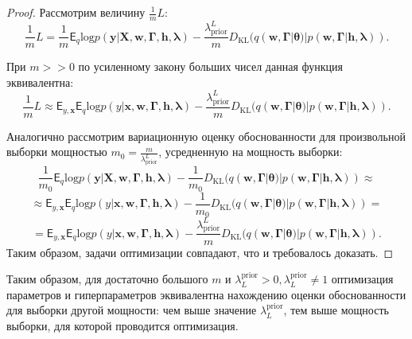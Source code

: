\begin{proof}
Рассмотрим величину  $\frac{1}{m}L$: \\
\[
    \frac{1}{m}L = \frac{1}{m}\mathsf{E}_q \text{log}p(\mathbf{y}|\mathbf{X},  \mathbf{w}, \boldsymbol{\Gamma}, \mathbf{h}, \boldsymbol{\lambda})-\frac{\lambda_\text{prior}^L}{m}D_\text{KL}(q(\mathbf{w}, \boldsymbol{\Gamma}|\boldsymbol{\theta})|p(\mathbf{w},\boldsymbol{\Gamma}|\mathbf{h}, \boldsymbol{\lambda})).
\]

При $m >> 0$ по усиленному закону больших чисел данная функция эквивалентна:
\[
    \frac{1}{m}L \approx  \mathsf{E}_{y, \mathbf{x}} \mathsf{E}_{q} \text{log}p(y|\mathbf{x}, \mathbf{w}, \boldsymbol{\Gamma}, \mathbf{h}, \boldsymbol{\lambda}) -\frac{\lambda_\text{prior}^L}{m}D_\text{KL}(q(\mathbf{w}, \boldsymbol{\Gamma}|\boldsymbol{\theta})|p(\mathbf{w},\boldsymbol{\Gamma}|\mathbf{h}, \boldsymbol{\lambda})).
\]

Аналогично рассмотрим вариационную оценку обоснованности для произвольной выборки мощностью $m_0 = \frac{m}{\lambda_\text{prior}^L}$, усредненную на мощность выборки:
\[
    \frac{1}{m_0}\mathsf{E}_q \text{log}p(\mathbf{y}|\mathbf{X},  \mathbf{w}, \boldsymbol{\Gamma}, \mathbf{h}, \boldsymbol{\lambda})-\frac{1}{m_0}D_\text{KL}(q(\mathbf{w}, \boldsymbol{\Gamma}|\boldsymbol{\theta})|p(\mathbf{w},\boldsymbol{\Gamma}|\mathbf{h}, \boldsymbol{\lambda})) \approx
\]
\[
\approx  \mathsf{E}_{y, \mathbf{x}} \mathsf{E}_{q} \text{log}p(y|\mathbf{x}, \mathbf{w}, \boldsymbol{\Gamma}, \mathbf{h}, \boldsymbol{\lambda}) -\frac{1}{m_0}D_\text{KL}(q(\mathbf{w}, \boldsymbol{\Gamma}|\boldsymbol{\theta})|p(\mathbf{w},\boldsymbol{\Gamma}|\mathbf{h}, \boldsymbol{\lambda})) = 
\]
\[
= \mathsf{E}_{y, \mathbf{x}} \mathsf{E}_{q} \text{log}p(y|\mathbf{x}, \mathbf{w}, \boldsymbol{\Gamma}, \mathbf{h}, \boldsymbol{\lambda}) -\frac{\lambda_\text{prior}^L}{m}D_\text{KL}(q(\mathbf{w}, \boldsymbol{\Gamma}|\boldsymbol{\theta})|p(\mathbf{w},\boldsymbol{\Gamma}|\mathbf{h}, \boldsymbol{\lambda})).
\]
Таким образом, задачи оптимизации совпадают, что и требовалось доказать.
\end{proof}
Таким образом, для достаточно большого $m$ и $\lambda^{\text{prior}}_L>0, \lambda^{\text{prior}}_L \neq 1$ оптимизация параметров и гиперпараметров эквивалентна нахождению оценки обоснованности для выборки другой мощности: чем выше значение $ \lambda^{\text{prior}}_L$, тем выше мощность выборки, для которой проводится оптимизация.

